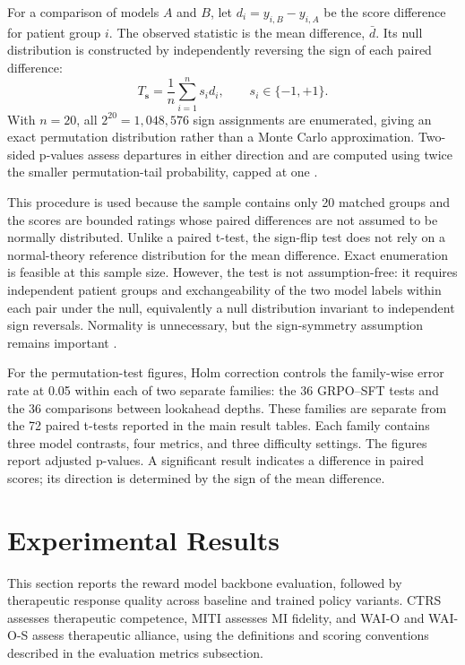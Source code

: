 For a comparison of models \(A\) and \(B\), let \(d_i=y_{i,B}-y_{i,A}\) be the score difference for patient group \(i\). The observed statistic is the mean difference, \(\bar d\). Its null distribution is constructed by independently reversing the sign of each paired difference:
\begin{equation}
T_{\mathbf{s}}=\frac{1}{n}\sum_{i=1}^{n}s_i d_i,
\qquad s_i\in\{-1,+1\}.
\end{equation}
With \(n=20\), all \(2^{20}=1{,}048{,}576\) sign assignments are enumerated, giving an exact permutation distribution rather than a Monte Carlo approximation. Two-sided p-values assess departures in either direction and are computed using twice the smaller permutation-tail probability, capped at one \cite{scipyPermutationTest}.

This procedure is used because the sample contains only 20 matched groups and the scores are bounded ratings whose paired differences are not assumed to be normally distributed. Unlike a paired t-test, the sign-flip test does not rely on a normal-theory reference distribution for the mean difference. Exact enumeration is feasible at this sample size. However, the test is not assumption-free: it requires independent patient groups and exchangeability of the two model labels within each pair under the null, equivalently a null distribution invariant to independent sign reversals. Normality is unnecessary, but the sign-symmetry assumption remains important \cite{scipyPermutationTest}.

For the permutation-test figures, Holm correction controls the family-wise error rate at 0.05 within each of two separate families: the 36 GRPO--SFT tests and the 36 comparisons between lookahead depths. These families are separate from the 72 paired t-tests reported in the main result tables. Each family contains three model contrasts, four metrics, and three difficulty settings. The figures report adjusted p-values. A significant result indicates a difference in paired scores; its direction is determined by the sign of the mean difference.

\section{Experimental Results}

This section reports the reward model backbone evaluation, followed by therapeutic response quality across baseline and trained policy variants. CTRS assesses therapeutic competence, MITI assesses MI fidelity, and WAI-O and WAI-O-S assess therapeutic alliance, using the definitions and scoring conventions described in the evaluation metrics subsection.

